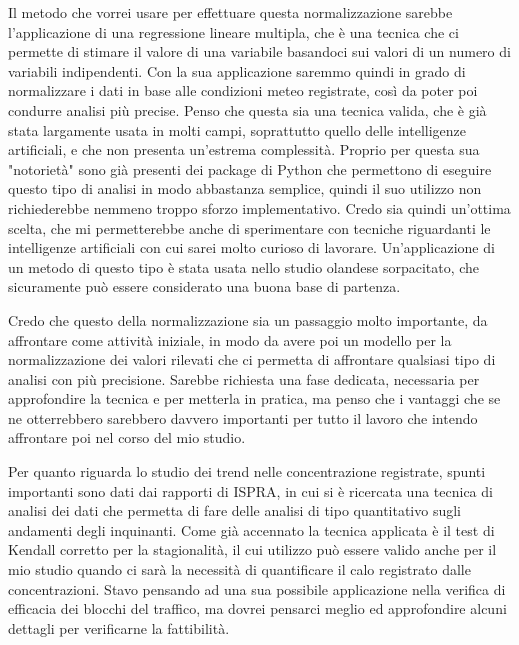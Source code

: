 \documentclass{article}
\begin{document}
Il metodo che vorrei usare per effettuare questa normalizzazione sarebbe l'applicazione di una regressione lineare multipla, che è una tecnica che ci permette di stimare il valore di una variabile basandoci sui valori di un numero di variabili indipendenti. Con la sua applicazione saremmo quindi in grado di normalizzare i dati in base alle condizioni meteo registrate, così da poter poi condurre analisi più precise. Penso che questa sia una tecnica valida, che è già stata largamente usata in molti campi, soprattutto quello delle intelligenze artificiali, e che non presenta un'estrema complessità. Proprio per questa sua "notorietà" sono già presenti dei package di Python che permettono di eseguire questo tipo di analisi in modo abbastanza semplice, quindi il suo utilizzo non richiederebbe nemmeno troppo sforzo implementativo. Credo sia quindi un'ottima scelta, che mi permetterebbe anche di sperimentare con tecniche riguardanti le intelligenze artificiali con cui sarei molto curioso di lavorare. Un'applicazione di un metodo di questo tipo è stata usata nello studio olandese sorpacitato\cite{hoogerbrugge2010trends}, che sicuramente può essere considerato una buona base di partenza.

Credo che questo della normalizzazione sia un passaggio molto importante, da affrontare come attività iniziale, in modo da avere poi un modello per la normalizzazione dei valori rilevati che ci permetta di affrontare qualsiasi tipo di analisi con più precisione. Sarebbe richiesta una fase dedicata, necessaria per approfondire la tecnica e per metterla in pratica, ma penso che i vantaggi che se ne otterrebbero sarebbero davvero importanti per tutto il lavoro che intendo affrontare poi nel corso del mio studio.

Per quanto riguarda lo studio dei trend nelle concentrazione registrate, spunti importanti sono dati dai rapporti di ISPRA\cite{cattani2018analisi}\cite{cattani2014analisi}, in cui si è ricercata una tecnica di analisi dei dati che permetta di fare delle analisi di tipo quantitativo sugli andamenti degli inquinanti. Come già accennato la tecnica applicata è il test di Kendall corretto per la stagionalità, il cui utilizzo può essere valido anche per il mio studio quando ci sarà la necessità di quantificare il calo registrato dalle concentrazioni. Stavo pensando ad una sua possibile applicazione nella verifica di efficacia dei blocchi del traffico, ma dovrei pensarci meglio ed approfondire alcuni dettagli per verificarne la fattibilità.
\end{document}
